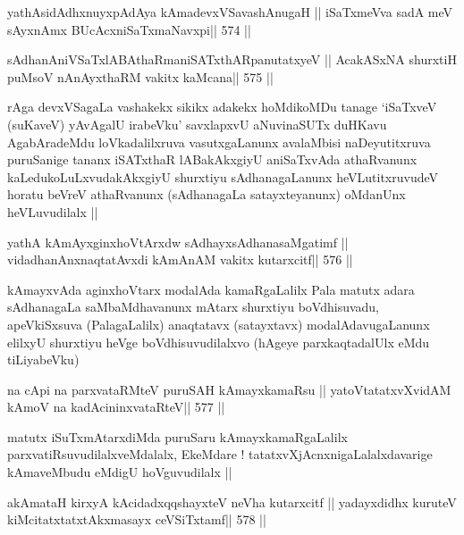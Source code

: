 \begin{shl}
yathAsidAdhxnuyxpAdAya kAmadevxVSavashAnugaH ||
iSaTxmeVva sadA meV sAyxnAmx BUcAcxniSaTxmaNavxpi\hfill || 574 ||
\end{shl}

\begin{shl}
sAdhanAniVSaTxlABAthaRmaniSATxthARpanutatxyeV ||
AcakASxNA shurxtiH puMsoV nAnAyxthaRM vakitx kaMcana\hfill || 575 ||
\end{shl}

\begin{artha}
rAga devxVSagaLa vashakekx sikikx adakekx hoMdikoMDu tanage `iSaTxveV
(suKaveV) yAvAgalU irabeVku' savxlapxvU aNuvinaSUTx duHKavu
AgabAradeMdu loVkadalilxruva vasutxgaLanunx avalaMbisi naDeyutitxruva
puruSanige tananx iSATxthaR lABakAkxgiyU aniSaTxvAda athaRvanunx
kaLedukoLuLxvudakAkxgiyU shurxtiyu sAdhanagaLanunx heVLutitxruvudeV
horatu beVreV athaRvanunx (sAdhanagaLa satayxteyanunx) oMdanUnx
heVLuvudilalx ||
\end{artha}



\begin{shl}
yathA kAmAyxginxhoVtArxdw sAdhayxsAdhanasaMgatimf ||
vidadhanAnxnaqtatAvxdi kAmAnAM vakitx kutarxcitf\hfill || 576 ||
\end{shl}

\begin{artha}
kAmayxvAda aginxhoVtarx modalAda kamaRgaLalilx Pala matutx adara
sAdhanagaLa saMbaMdhavanunx mAtarx shurxtiyu boVdhisuvadu,
apeVkiSxsuva (PalagaLalilx) anaqtatavx (satayxtavx) modalAdavugaLanunx
elilxyU shurxtiyu heVge boVdhisuvudilalxvo (hAgeye parxkaqtadalUlx
eMdu tiLiyabeVku)
\end{artha}

\begin{shl}
na cApi na parxvataRMteV puruSAH kAmayxkamaRsu ||
yatoV\s tatatxvXvidAM kAmoV na kadAcininxvataRteV\hfill || 577 ||
\end{shl}

\begin{artha}
matutx iSuTxmAtarxdiMda puruSaru kAmayxkamaRgaLalilx
parxvatiRsuvudilalxveMdalalx, EkeMdare ! tatatxvXjAcnxnigaLalalxdavarige
kAmaveMbudu eMdigU hoVguvudilalx ||
\end{artha}

\begin{shl}
akAmataH kirxyA kAcidadxqqshayxteV neVha kutarxcitf ||
yadayxdidhx kuruteV kiMcitatxtatxtAkxmasayx ceVSiTxtamf\hfill || 578 ||
\end{shl}

